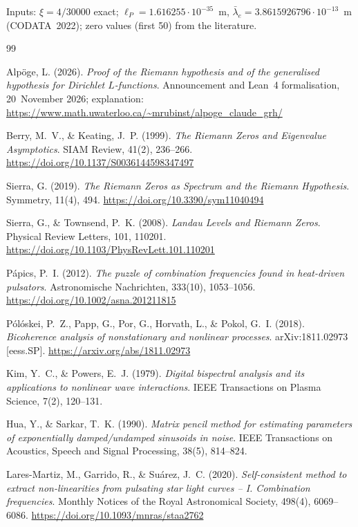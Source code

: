 Inputs: $\xi = 4/30000$ exact; $\ell_P = 1.616255\cdot10^{-35}$~m,
$\bar\lambda_e = 3.8615926796\cdot10^{-13}$~m (CODATA~2022); zero values
(first 50) from the literature.

\begin{thebibliography}{99}

Alpöge, L. (2026).
\textit{Proof of the Riemann hypothesis and of the generalised hypothesis for Dirichlet $L$-functions}.
Announcement and Lean~4 formalisation, 20~November 2026; explanation:
\url{https://www.math.uwaterloo.ca/~mrubinst/alpoge_claude_grh/}

Berry, M.~V., \& Keating, J.~P. (1999).
\textit{The Riemann Zeros and Eigenvalue Asymptotics}.
SIAM Review, 41(2), 236--266.
\url{https://doi.org/10.1137/S0036144598347497}

Sierra, G. (2019).
\textit{The Riemann Zeros as Spectrum and the Riemann Hypothesis}.
Symmetry, 11(4), 494.
\url{https://doi.org/10.3390/sym11040494}

Sierra, G., \& Townsend, P.~K. (2008).
\textit{Landau Levels and Riemann Zeros}.
Physical Review Letters, 101, 110201.
\url{https://doi.org/10.1103/PhysRevLett.101.110201}

P\'apics, P.~I. (2012).
\textit{The puzzle of combination frequencies found in heat-driven
pulsators}.
Astronomische Nachrichten, 333(10), 1053--1056.
\url{https://doi.org/10.1002/asna.201211815}

P\'ol\'oskei, P.~Z., Papp, G., Por, G., Horvath, L., \& Pokol, G.~I.
(2018).
\textit{Bicoherence analysis of nonstationary and nonlinear processes}.
arXiv:1811.02973 [eess.SP].
\url{https://arxiv.org/abs/1811.02973}

Kim, Y.~C., \& Powers, E.~J. (1979).
\textit{Digital bispectral analysis and its applications to nonlinear
wave interactions}.
IEEE Transactions on Plasma Science, 7(2), 120--131.

Hua, Y., \& Sarkar, T.~K. (1990).
\textit{Matrix pencil method for estimating parameters of exponentially
damped/undamped sinusoids in noise}.
IEEE Transactions on Acoustics, Speech and Signal Processing, 38(5),
814--824.

Lares-Martiz, M., Garrido, R., \& Su\'arez, J.~C. (2020).
\textit{Self-consistent method to extract non-linearities from
pulsating star light curves -- I. Combination frequencies}.
Monthly Notices of the Royal Astronomical Society, 498(4), 6069--6086.
\url{https://doi.org/10.1093/mnras/staa2762}


\end{thebibliography}
